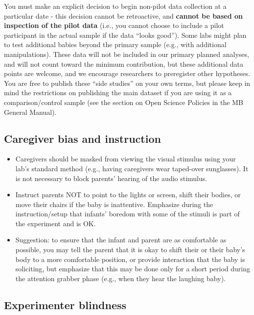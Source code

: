 \documentclass[
  letterpaper,
  DIV=11,
  numbers=noendperiod,
  oneside]{scrreprt}
\begin{document}
You must make an explicit decision to begin non-pilot data collection at
a particular date - this decision cannot be retroactive, and
\textbf{cannot be based on inspection of the pilot data} (i.e., you
cannot choose to include a pilot participant in the actual sample if the
data ``looks good''). Some labs might plan to test additional babies
beyond the primary sample (e.g., with additional manipulations). These
data will not be included in our primary planned analyses, and will not
count toward the minimum contribution, but these additional data points
are welcome, and we encourage researchers to preregister other
hypotheses. You are free to publish these ``side studies'' on your own
terms, but please keep in mind the restrictions on publishing the main
dataset if you are using it as a comparison/control sample (see the
section on Open Science Policies in the MB General Manual).

\subsection{Caregiver bias and
instruction}\label{caregiver-bias-and-instruction}

\begin{itemize}
\item
  Caregivers should be masked from viewing the visual stimulus using
  your lab's standard method (e.g., having caregivers wear taped-over
  sunglasses). It is not necessary to block parents' hearing of the
  audio stimulus.
\item
  Instruct parents NOT to point to the lights or screen, shift their
  bodies, or move their chairs if the baby is inattentive. Emphasize
  during the instruction/setup that infants' boredom with some of the
  stimuli is part of the experiment and is OK.
\item
  Suggestion: to ensure that the infant and parent are as comfortable as
  possible, you may tell the parent that it is okay to shift their or
  their baby's body to a more comfortable position, or provide
  interaction that the baby is soliciting, but emphasize that this may
  be done only for a short period during the attention grabber phase
  (e.g., when they hear the laughing baby).
\end{itemize}

\subsection{Experimenter blindness}\label{experimenter-blindness}
\end{document}
